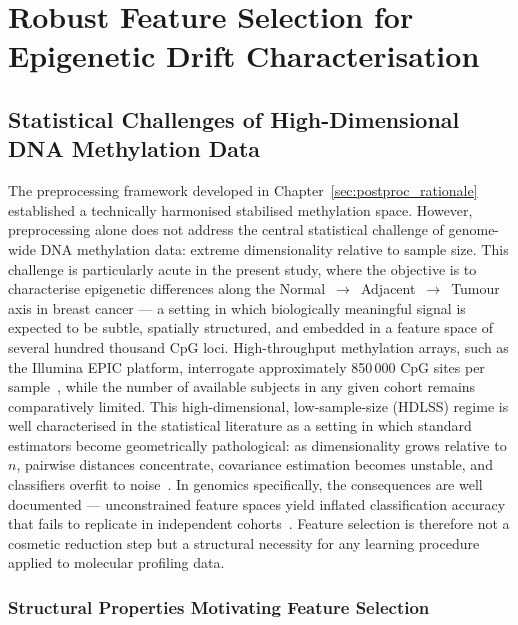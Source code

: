 \chapter{Robust Feature Selection for Epigenetic Drift Characterisation}
\label{chap:feature_selection}


\section{Statistical Challenges of High-Dimensional DNA Methylation Data}
\label{sec:fs_hdlss}

The preprocessing framework developed in Chapter~\ref{sec:postproc_rationale} 
established a technically harmonised stabilised methylation space. 
However, preprocessing alone does not address the central statistical challenge 
of genome-wide DNA methylation data: extreme dimensionality relative to sample 
size. This challenge is particularly acute in the present study, where the 
objective is to characterise epigenetic differences along the 
Normal~$\to$~Adjacent~$\to$~Tumour axis in breast cancer — a setting in which 
biologically meaningful signal is expected to be subtle, spatially structured, 
and embedded in a feature space of several hundred thousand CpG loci.
High-throughput methylation arrays, such as the Illumina EPIC platform, 
interrogate approximately 850\,000 CpG sites per sample~\cite{Pidsley2016}, 
while the number of available subjects in any given cohort remains 
comparatively limited. This high-dimensional, low-sample-size (HDLSS) regime 
is well characterised in the statistical literature as a setting in which 
standard estimators become geometrically pathological: as dimensionality grows 
relative to $n$, pairwise distances concentrate, covariance estimation becomes 
unstable, and classifiers overfit to noise~\cite{Hall2005, Donoho2000}. In 
genomics specifically, the consequences are well documented — unconstrained 
feature spaces yield inflated classification accuracy that fails to replicate 
in independent cohorts~\cite{Ambroise2002, Smialowski2010}.
Feature selection is therefore not a cosmetic reduction step but a structural 
necessity for any learning procedure applied to molecular profiling data.

\subsection{Structural Properties Motivating Feature Selection}

